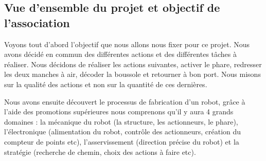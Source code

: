 \documentclass[a4paper,10pt]{article}
\begin{document}
\begin{spacing}{1.5}
\subsection{Vue d'ensemble du projet et objectif de l'association}
Voyons tout d'abord l'objectif que nous allons nous fixer pour ce projet. Nous
avons décidé en commun des différentes actions et des différentes tâches à
réaliser. Nous décidons de réaliser les actions suivantes, activer le phare,
redresser les deux manches à air, décoder la boussole et retourner à bon port.
Nous misons sur la qualité des actions et non sur la quantité de ces
dernières.

Nous avons ensuite découvert le processus de fabrication d'un robot, grâce
à l'aide des promotions supérieures nous comprenons qu'il y aura 4 grands
domaines :  la mécanique du robot (la structure, les actionneurs, le phare),
l'électronique (alimentation du robot,
contrôle des actionneurs, création du compteur de points etc), l'asservissement (direction
précise du robot) et la stratégie (recherche de chemin, choix des actions à
faire etc).

\end{spacing}
\end{document}
